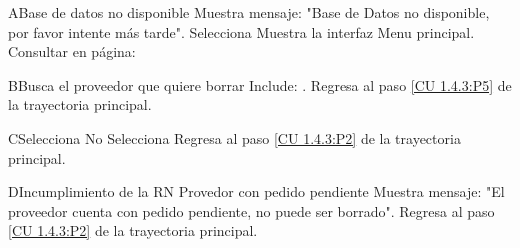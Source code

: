{

\begin{UCtrayectoriaA}{A}{Base de datos no disponible}
	\UCpaso [\UCsist]		Muestra mensaje: "Base de Datos no disponible, por favor intente más tarde".
	\UCpaso [\UCactor]	Selecciona 
	\UCpaso Muestra la interfaz Menu principal. Consultar en página: \pageref{UI: menu principal}
\end{UCtrayectoriaA}

\begin{UCtrayectoriaA}{B}{Busca el proveedor que quiere borrar}
	\UCpaso Include: .
	\UCpaso Regresa al paso \ref{CU 1.4.3:P5} de la trayectoria principal.
\end{UCtrayectoriaA}

\begin{UCtrayectoriaA}{C}{Selecciona No}
	\UCpaso [\UCactor]	Selecciona 
	\UCpaso Regresa al paso \ref{CU 1.4.3:P2} de la trayectoria principal.
\end{UCtrayectoriaA}

\begin{UCtrayectoriaA}{D}{Incumplimiento de la RN Provedor con pedido pendiente}
	\UCpaso [\UCsist]		Muestra mensaje: "El proveedor cuenta con pedido pendiente, no puede ser borrado".
	\UCpaso Regresa al paso \ref{CU 1.4.3:P2} de la trayectoria principal.
\end{UCtrayectoriaA}

}
